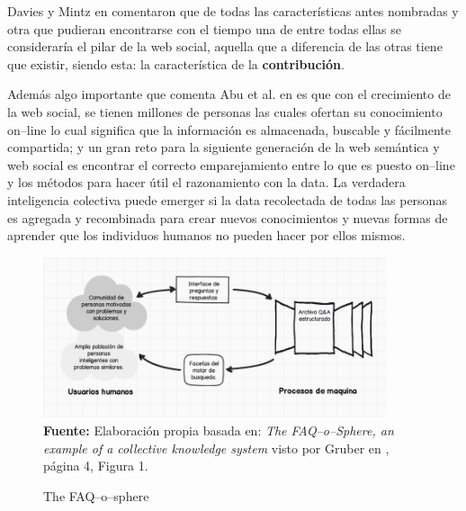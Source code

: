 \documentclass[oneside,12pt,a4paper]{memoir}%
\begin{document}
	Davies y Mintz en \cite{Davies2009} comentaron que de todas las
	caracter\'isticas antes nombradas y otra que pudieran encontrarse con el tiempo
	una de entre todas ellas se considerar\'ia el pilar de la web social, aquella
	que a diferencia de las otras tiene que existir, siendo esta: la
	caracter\'istica de la \textbf{contribuci\'on}.
	
	Adem\'as algo importante que comenta Abu et al. en
	\cite{Bani2011} es que con el crecimiento de la web social, se tienen millones
	de personas las cuales ofertan su conocimiento on--line lo cual significa que
	la informaci\'on es almacenada, buscable y f\'acilmente compartida; y un gran
	reto para la siguiente generaci\'on de la web sem\'antica y web social es
	encontrar el correcto emparejamiento entre lo que es puesto on--line y los
	m\'etodos para hacer \'util el razonamiento con la data. La verdadera
	inteligencia colectiva puede emerger si la data recolectada de todas las
	personas es agregada y recombinada para crear nuevos conocimientos y nuevas
	formas de aprender que los individuos humanos no pueden hacer por ellos mismos.
	
	\begin{figure}[here]
		\centering
		\caption{The FAQ--o--sphere}
		\includegraphics[width=0.9\textwidth]{figure/fig_faqosphere.png}
		\newline
		\textbf{Fuente:} Elaboraci\'on propia basada en: \textit{The
		FAQ--o--Sphere, an example of a collective knowledge system} visto por Gruber
		en \cite{Gruber2008}, p\'agina 4, Figura 1.
		\label{fig:FAQoSphere}
	\end{figure}
	 
\end{document}
